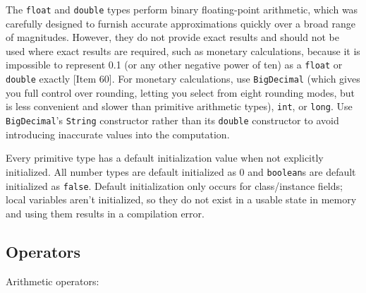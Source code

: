 \documentclass[table, xcdraw]{article}%
\begin{document}
The \texttt{float} and \texttt{double} types perform binary floating-point arithmetic, which was carefully designed to furnish accurate approximations quickly over a broad range of magnitudes. However, they do not provide exact results and should not be used where exact results are required, such as monetary calculations, because it is impossible to represent 0.1 (or any other negative power of ten) as a \texttt{float} or \texttt{double} exactly [Item 60]. For monetary calculations, use \texttt{BigDecimal} (which gives you full control over rounding, letting you select from eight rounding modes, but is less convenient and slower than primitive arithmetic types), \texttt{int}, or \texttt{long}. Use \texttt{BigDecimal}’s \texttt{String} constructor rather than its \texttt{double} constructor to avoid introducing inaccurate values into the computation.

Every primitive type has a default initialization value when not explicitly initialized. All number types are default initialized as 0 and \texttt{boolean}s are default initialized as \texttt{false}. Default initialization only occurs for class/instance fields; local variables aren't initialized, so they do not exist in a usable state in memory and using them results in a compilation error.

\subsection{Operators}

Arithmetic operators:

\end{document}
